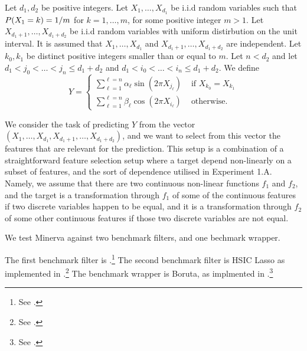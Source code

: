Let 
$d_1, d_2$
be positive integers.
Let
$X_1, \dots, X_{d_1}$
be i.i.d random variables
such that
${{P}}(X_1 = k) = 1/m$
for $k=1, \dots, m$,
for some positive integer 
$m > 1$.
Let 
$X_{d_1 + 1}, \dots, X_{d_1 + d_2}$
be i.i.d random variables with uniform distirbution on the unit interval. 
It is assumed that 
$X_1, \dots, X_{d_1}$
and
$X_{d_1 + 1}, \dots, X_{d_1 + d_2}$
are independent. 
Let 
$k_0, k_1$
be distinct positive integers 
smaller than or equal to
$m$.
Let 
$n < d_2$
and 
let
$d_1 < j_0 <  \dots < j_n \leq d_1 + d_2$
and
$d_1 < i_0 <  \dots < i_n \leq d_1 + d_2$.
We define
\begin{equation}
	\label{eq.exp2target}
	Y 
	=
	\begin{cases}
		\sum_{\ell = 1}^{\ell=n} \alpha_\ell \sin\left(2\pi X_{j_\ell}\right)  
		& \text{ if } X_{k_0} = X_{k_1}
		\\
		\sum_{\ell = 1}^{\ell=n} \beta_\ell \cos\left(2\pi X_{i_\ell}\right)  
		& \text{ otherwise}.
	\end{cases}
\end{equation}



We consider the task of predicting $Y$ from the vector 
$(X_1, \dots, X_{d_1}, X_{d_1 + 1}, \dots, X_{d_1 + d_2})$,
and 
we want to select 
from this vector 
the features that are relevant for the prediction.
This setup is a combination of a 
straightforward feature selection setup 
where a target depend non-linearly on a subset of features,
and 
the sort of dependence utilised in Experiment 1.A.
Namely,
we assume that 
there are two continuous non-linear functions $f_1$ and $f_2$,
and
the target is a transformation through $f_1$
of some of the continuous features if two discrete  variables happen to be equal,
and it is a transformation through $f_2$
of some other continuous features if those two discrete variables are not equal. 

We test 
Minerva
against two benchmark filters, 
and one bechmark wrapper.

The first benchmark filter is 
.\footnote{
See
.
}
The second benchmark filter is
HSIC Lasso
as implemented in 
.\footnote{
See .
}
The benchmark wrapper is Boruta,
as implmented in
.\footnote{
See
.
}


